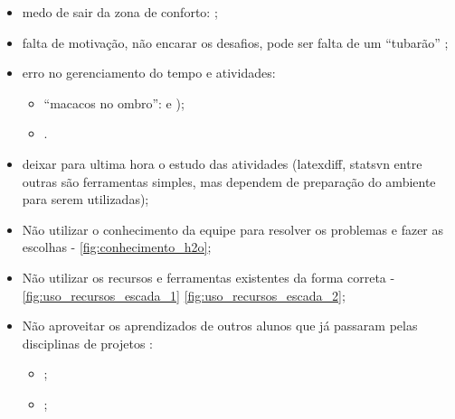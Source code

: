 \begin{itemize}
    \item medo de sair da zona de conforto:
    ;
    
    \item falta de motivação, não encarar os desafios, pode ser falta de um \enquote{tubarão} \cite{tubarao_na_vida} \cite{put_a_shark_in_your_tank} \cite{employees_challenge};
    
    \item erro no gerenciamento do tempo e atividades:
    \begin{itemize}
        \item \enquote{macacos no ombro}:
    e
    );
    
        \item {} \cite{ted_tim_urban_procastinator}.
    \end{itemize}

    \item deixar para ultima hora o estudo das atividades (latexdiff, statsvn entre outras são ferramentas simples, mas dependem de preparação do ambiente para serem utilizadas);

    \item Não utilizar o conhecimento da equipe para resolver os problemas e fazer as escolhas - \autoref{fig:conhecimento_h2o};
    
    \item Não utilizar os recursos e ferramentas existentes da forma correta - \autoref{fig:uso_recursos_escada_1} \autoref{fig:uso_recursos_escada_2};

    \item Não aproveitar os aprendizados de outros alunos que já passaram pelas disciplinas de projetos :
    \begin{itemize}
        \item {};

        \item {};


\end{itemize}
\end{itemize}

